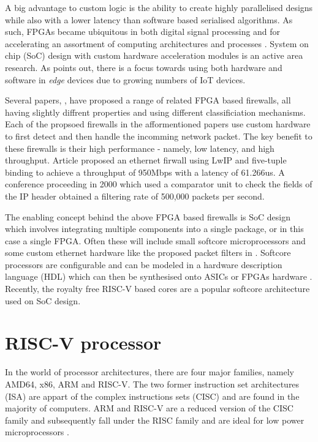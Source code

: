 A big advantage to custom logic is the ability to create highly parallelised designs while also with a lower latency than software based serialised algorithms. 
As such, FPGAs became ubiquitous in both digital signal processing and for accelerating an assortment of computing architectures and processes \cite{FPGAComputing}.
System on chip (SoC) design with custom hardware acceleration modules is an active area research. As \cite{FPGAComputing} points out, there is a focus towards 
using both hardware and software in \textit{edge} devices due to growing numbers of IoT devices.

Several papers, \cite{LwIPFPGAFirewall} \cite{IPFPGAFirewall2000} \cite{packetFilteringFPGA}, have proposed a range of related FPGA based firewalls, all having 
slightly diffrent properties and using different classificiation mechanisms. Each of the propsoed firewalls in the afformentioned papers use custom hardware 
to first detect and then handle the incomming network packet. The key benefit to these firewalls is their high 
performance - namely, low latency, and high throughput. Article \cite{LwIPFPGAFirewall} proposed an ethernet firwall using LwIP and five-tuple binding 
to achieve a throughput of 950Mbps with a latency of 61.266us. A conference proceeding in 2000 \cite{IPFPGAFirewall2000} which used a comparator unit to check the 
fields of the IP header obtained a filtering rate of 500,000 packets per second. 

The enabling concept behind the above FPGA based firewalls is SoC design which involves integrating multiple components into a single package, or in this case a 
single FPGA. Often these will include small softcore microprocessors and some custom ethernet hardware like the proposed packet filters in \cite{LwIPFPGAFirewall}.
Softcore processors are configurable and can be modeled in a hardware description language (HDL) which can then be synthesised onto ASICs or FPGAs hardware 
\cite{SoftcoreBasedEmbeddedSystems}. Recently, the royalty free RISC-V based cores are a popular softcore architecture used on SoC design.


\section{RISC-V processor}
In the world of processor architectures, there are four major families, namely AMD64, x86, ARM and RISC-V. The two former instruction set architectures (ISA) 
are appart of the complex instructions sets (CISC) and are found in the majority of computers. ARM and RISC-V are a reduced version of the CISC family and 
subsequently fall under the RISC family and are ideal for low power microprocessors \cite{RV16Embedded}.

